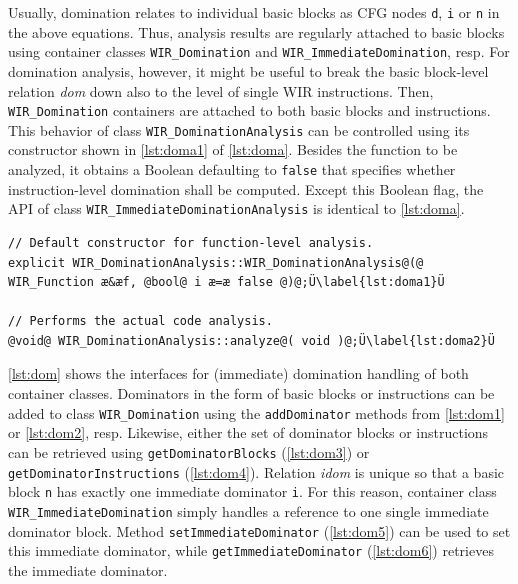 Usually, domination relates to individual basic blocks as \gls{CFG} nodes \texttt{d}, \texttt{i} or \texttt{n} in the above equations.
Thus, analysis results are regularly attached to basic blocks using container classes \texttt{WIR\_Domination} and \texttt{WIR\_Immediate\-Domination}, resp.
For domination analysis, however, it might be useful to break the basic block-level relation \textit{dom} down also to the level of single \gls{WIR} instructions. Then, \texttt{WIR\_Domination} containers are attached to both basic blocks and instructions.
This behavior of class \texttt{WIR\_DominationAnalysis} can be controlled using its constructor shown in \cref{lst:doma1} of \cref{lst:doma}.
Besides the function to be analyzed, it obtains a Boolean defaulting to \texttt{false} that specifies whether instruction-level domination shall be computed.
Except this Boolean flag, the \gls{API} of class \texttt{WIR\_ImmediateDominationAnalysis} is identical to \cref{lst:doma}.

\begin{lstlisting}[style=code,float=h,caption={Public Interface of Class \texttt{WIR\_DominationAnalysis}},label=lst:doma]
// Default constructor for function-level analysis.
explicit WIR_DominationAnalysis::WIR_DominationAnalysis@(@ WIR_Function æ&æf, @bool@ i æ=æ false @)@;Ü\label{lst:doma1}Ü

// Performs the actual code analysis.
@void@ WIR_DominationAnalysis::analyze@( void )@;Ü\label{lst:doma2}Ü
\end{lstlisting}

\cref{lst:dom} shows the interfaces for (immediate) domination handling of both container classes.
Dominators in the form of basic blocks or instructions can be added to class \texttt{WIR\_Domination} using the \texttt{addDominator} methods from \cref{lst:dom1} or \cref{lst:dom2}, resp.
Likewise, either the set of dominator blocks or instructions can be retrieved using \texttt{getDominatorBlocks} (\cref{lst:dom3}) or \texttt{getDominatorInstructions} (\cref{lst:dom4}).
Relation \textit{idom} is unique so that a basic block \texttt{n} has exactly one immediate dominator \texttt{i}.
For this reason, container class \texttt{WIR\_ImmediateDomination} simply handles a reference to one single immediate dominator block.
Method \texttt{setImmediateDominator} (\cref{lst:dom5}) can be used to set this immediate dominator, while \texttt{getImmediateDominator} (\cref{lst:dom6}) retrieves the immediate dominator.

